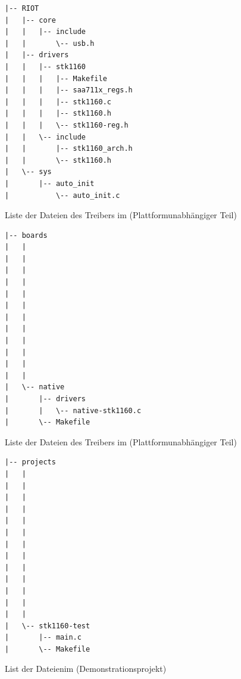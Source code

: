 \begin{landscape}
\begin{figure}[htbp]
  \centering
  \begin{minipage}[b]{9cm}
  \begin{verbatim}
|-- RIOT
|   |-- core
|   |   |-- include
|   |       \-- usb.h
|   |-- drivers
|   |   |-- stk1160
|   |   |   |-- Makefile
|   |   |   |-- saa711x_regs.h
|   |   |   |-- stk1160.c
|   |   |   |-- stk1160.h
|   |   |   \-- stk1160-reg.h
|   |   \-- include
|   |       |-- stk1160_arch.h
|   |       \-- stk1160.h
|   \-- sys
|       |-- auto_init
|           \-- auto_init.c
    \end{verbatim}
 
    \caption{Liste der Dateien des Treibers im \riotrepo \newline(Plattformunabhängiger Teil)}
    \label{fig:srcoverviewriot}
  \end{minipage}
  \begin{minipage}[b]{9cm}
    \begin{verbatim}
|-- boards
|   |
|   |
|   |
|   |
|   |
|   |
|   |
|   |
|   |
|   |
|   |
|   |
|   \-- native
|       |-- drivers
|       |   \-- native-stk1160.c
|       \-- Makefile
    \end{verbatim}
    \caption{Liste der Dateien des Treibers im \boardsrepo \newline(Plattformunabhängiger Teil)}
    \label{fig:srcoverviewboards}
  \end{minipage}
  \begin{minipage}[b]{9cm}
    \begin{verbatim}
|-- projects
|   |
|   |
|   |
|   |
|   |
|   |
|   |
|   |
|   |
|   |
|   |
|   |
|   |
|   \-- stk1160-test
|       |-- main.c
|       \-- Makefile
    \end{verbatim}
    \caption{List der Dateien\newline im \projectsrepo \newline(Demonstrationsprojekt)}
    \label{fig:srcoverviewprojects}
  \end{minipage}
  \end{figure}
\end{landscape}
\restoregeometry

